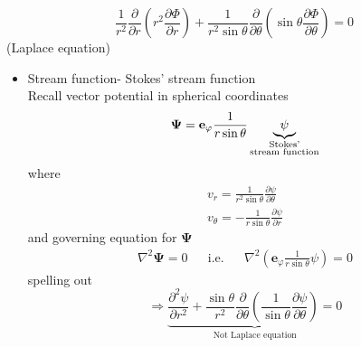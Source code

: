 \begin{equation}
\frac{1}{r^2}\frac{\partial}{\partial r}\left(r^2\frac{\partial\Phi}{\partial r}\right) + \frac{1}{r^2\sin\theta}\frac{\partial}{\partial\theta}\left(\sin\theta\frac{\partial\Phi}{\partial\theta}\right) = 0
\label{eq: 7-1-2}
\end{equation}
(Laplace equation)
\begin{itemize}
\item Stream function- Stokes' stream function\\
Recall vector potential in spherical coordinates
\[
\boldsymbol{\Psi} = \mathbf{e_\varphi}\frac{1}{r\sin\theta}\underbrace{\psi}_{
\begin{subarray}{c}
  \text{Stokes'}\\
  \text{stream function}
\end{subarray}
}
\]
where
\begin{subequations}
\label{eq: 7-1-3}
\begin{align}
v_r = \frac{1}{r^2\sin\theta}\frac{\partial\psi}{\partial\theta} \label{eq: 7-1-3a}\\
v_\theta = -\frac{1}{r\sin\theta}\frac{\partial\psi}{\partial r}\label{eq: 7-1-3b}
\end{align}
\end{subequations}
and governing equation for $\boldsymbol{\Psi}$
\begin{align*}
\nabla^2\boldsymbol{\Psi} = 0&&\text{i.e.}&&\nabla^2\left(\mathbf{e}_\varphi\frac{1}{r\sin\theta}\psi\right)=0
\end{align*}
spelling out
\begin{equation}
\Longrightarrow
\underbrace{\frac{\partial^2\psi}{\partial r^2}+\frac{\sin\theta}{r^2}\frac{\partial}{\partial\theta}\left(\frac{1}{\sin\theta}\frac{\partial\psi}{\partial\theta}\right) = 0}_{\text{Not Laplace equation}}
\label{eq: 7-1-4}
\end{equation}
\end{itemize}
